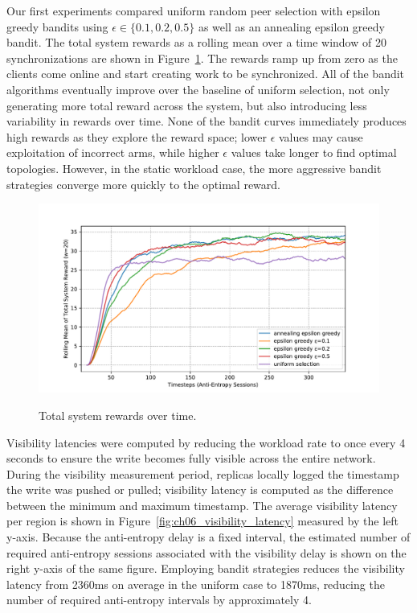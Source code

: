 Our first experiments compared uniform random peer selection with epsilon
greedy bandits using $\epsilon \in \{0.1, 0.2, 0.5\}$ as well as an annealing
epsilon greedy bandit.
The total system rewards as a rolling mean over a time window of 20
synchronizations are shown in Figure~\ref{fig:ch06_rewards}.
The rewards ramp up from zero as the clients come online and start
creating work to be synchronized.
All of the bandit algorithms eventually improve over the baseline of uniform
selection, not only generating more total reward across the system, but also
introducing less variability in rewards over time.
None of the bandit curves immediately produces high rewards as they explore
the reward space; lower $\epsilon$ values may cause exploitation of incorrect
arms, while higher $\epsilon$ values take longer to find optimal topologies.
However, in the static workload case, the more aggressive bandit strategies
converge more quickly to the optimal reward.

\begin{figure}
    \begin{center}
        \includegraphics[width=5in]{figures/ch06_rewards.pdf}
    \end{center}
    \renewcommand{\baselinestretch}{1}
    \small\normalsize

    \begin{quote}
        \caption[Bandit Rewards]{Total system rewards over time.}
        \label{fig:ch06_rewards}
    \end{quote}
\end{figure}
\renewcommand{\baselinestretch}{2}
\small\normalsize

Visibility latencies were computed by reducing the workload rate to once
every 4 seconds to ensure the write becomes fully visible across the entire
network.
During the visibility measurement period, replicas locally logged the
timestamp the write was pushed or pulled; visibility latency is computed as
the difference between the minimum and maximum timestamp.
The average visibility latency per region is shown in
Figure~\ref{fig:ch06_visibility_latency} measured by the left y-axis.
Because the anti-entropy delay is a fixed interval, the estimated number of
required anti-entropy sessions associated with the visibility delay is shown
on the right y-axis of the same figure.
Employing bandit strategies reduces the visibility latency from 2360ms on
average in the uniform case to 1870ms, reducing the number of required
anti-entropy intervals by approximately 4.


